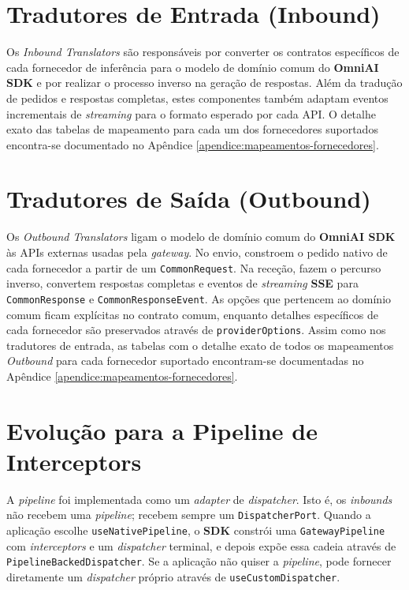     \section{Tradutores de Entrada (Inbound)}

    Os \textit{Inbound Translators} são responsáveis por converter os contratos específicos de cada fornecedor de inferência para o modelo de domínio comum do \textbf{OmniAI SDK} e por realizar o processo inverso na geração de respostas.
    Além da tradução de pedidos e respostas completas, estes componentes também adaptam eventos incrementais de \textit{streaming} para o formato esperado por cada API. O detalhe exato das tabelas de mapeamento para cada um dos fornecedores suportados encontra-se documentado no Apêndice \ref{apendice:mapeamentos-fornecedores}.

    \section{Tradutores de Saída (Outbound)}

    Os \textit{Outbound Translators} ligam o modelo de domínio comum do \textbf{OmniAI SDK} às APIs externas usadas pela \textit{gateway}. No envio, constroem o pedido nativo de cada fornecedor a partir de um \texttt{CommonRequest}. Na receção, fazem o percurso inverso, convertem respostas completas e eventos de \textit{streaming} \textbf{SSE} para \texttt{CommonResponse} e \texttt{CommonResponseEvent}. As opções que pertencem ao domínio comum ficam explícitas no contrato comum, enquanto detalhes específicos de cada fornecedor são preservados através de \texttt{providerOptions}.
    Assim como nos tradutores de entrada, as tabelas com o detalhe exato de todos os mapeamentos \textit{Outbound} para cada fornecedor suportado encontram-se documentadas no Apêndice \ref{apendice:mapeamentos-fornecedores}.

    \section{Evolução para a Pipeline de Interceptors}
    A \textit{pipeline} foi implementada como um \textit{adapter} de \textit{dispatcher}. Isto é, os \textit{inbounds} não recebem uma \textit{pipeline}; recebem sempre um \texttt{DispatcherPort}. Quando a aplicação escolhe \texttt{use\allowbreak Native\allowbreak Pipeline}, o \textbf{SDK} constrói uma \texttt{GatewayPipeline} com \textit{interceptors} e um \textit{dispatcher} terminal, e depois expõe essa cadeia através de \texttt{PipelineBackedDispatcher}. Se a aplicação não quiser a \textit{pipeline}, pode fornecer diretamente um \textit{dispatcher} próprio através de \texttt{useCustomDispatcher}.

